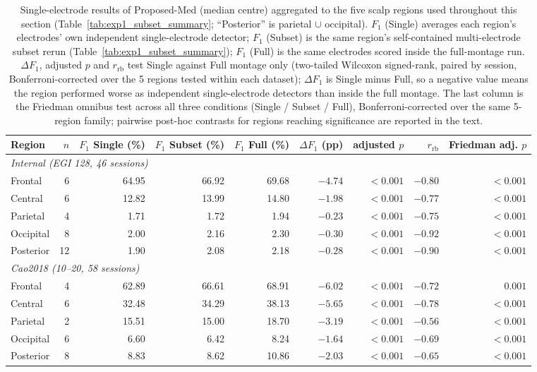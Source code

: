 \begin{table}[htbp]
\centering
\footnotesize
\setlength{\tabcolsep}{4pt}
\caption{Single-electrode results of Proposed-Med (median centre) aggregated to the five scalp regions used throughout this section (Table~\ref{tab:exp1_subset_summary}; ``Posterior'' is parietal $\cup$ occipital). $F_1$ (Single) averages each region's electrodes' own independent single-electrode detector; $F_1$ (Subset) is the same region's self-contained multi-electrode subset rerun (Table~\ref{tab:exp1_subset_summary}); $F_1$ (Full) is the same electrodes scored inside the full-montage run. $\Delta F_1$, adjusted $p$ and $r_{\mathrm{rb}}$ test Single against Full montage only (two-tailed Wilcoxon signed-rank, paired by session, Bonferroni-corrected over the 5 regions tested within each dataset); $\Delta F_1$ is Single minus Full, so a negative value means the region performed worse as independent single-electrode detectors than inside the full montage. The last column is the Friedman omnibus test across all three conditions (Single / Subset / Full), Bonferroni-corrected over the same 5-region family; pairwise post-hoc contrasts for regions reaching significance are reported in the text.}
\label{tab:exp1_single_channel_region}
\begin{tabular}{lrrrrrrrr}
\toprule
Region & $n$ & $F_1$ Single (\%) & $F_1$ Subset (\%) & $F_1$ Full (\%) & $\Delta F_1$ (pp) & adjusted $p$ & $r_{\mathrm{rb}}$ & Friedman adj. $p$ \\
\midrule
\multicolumn{8}{l}{\textit{Internal (EGI 128, 46 sessions)}} \\[2pt]
Frontal & 6 & 64.95 & 66.92 & 69.68 & $-4.74$ & $<0.001$ & $-0.80$ & $<0.001$ \\
Central & 6 & 12.82 & 13.99 & 14.80 & $-1.98$ & $<0.001$ & $-0.77$ & $<0.001$ \\
Parietal & 4 & 1.71 & 1.72 & 1.94 & $-0.23$ & $<0.001$ & $-0.75$ & $<0.001$ \\
Occipital & 8 & 2.00 & 2.16 & 2.30 & $-0.30$ & $<0.001$ & $-0.92$ & $<0.001$ \\
Posterior & 12 & 1.90 & 2.08 & 2.18 & $-0.28$ & $<0.001$ & $-0.90$ & $<0.001$ \\
\midrule
\multicolumn{8}{l}{\textit{Cao2018 (10--20, 58 sessions)}} \\[2pt]
Frontal & 4 & 62.89 & 66.61 & 68.91 & $-6.02$ & $<0.001$ & $-0.72$ & $0.001$ \\
Central & 6 & 32.48 & 34.29 & 38.13 & $-5.65$ & $<0.001$ & $-0.78$ & $<0.001$ \\
Parietal & 2 & 15.51 & 15.00 & 18.70 & $-3.19$ & $<0.001$ & $-0.56$ & $<0.001$ \\
Occipital & 6 & 6.60 & 6.42 & 8.24 & $-1.64$ & $<0.001$ & $-0.69$ & $<0.001$ \\
Posterior & 8 & 8.83 & 8.62 & 10.86 & $-2.03$ & $<0.001$ & $-0.65$ & $<0.001$ \\
\bottomrule
\end{tabular}
\end{table}
